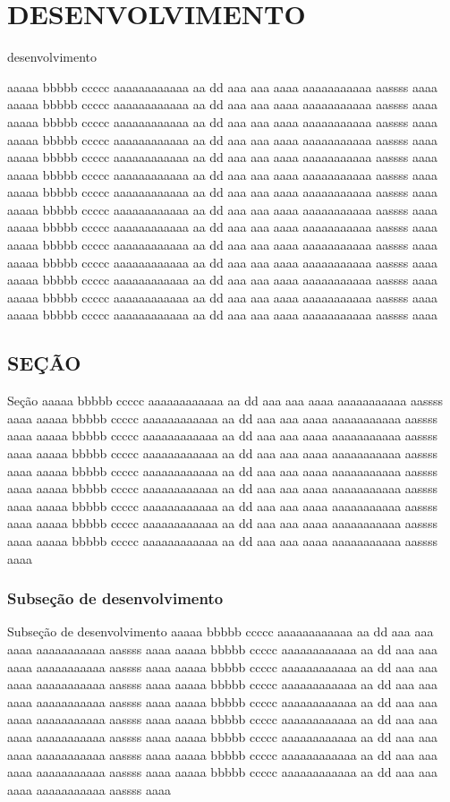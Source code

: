 \chapter{DESENVOLVIMENTO}{desenvolvimento}

aaaaa bbbbb ccccc aaaaaaaaaaaa aa dd  aaa aaa aaaa aaaaaaaaaaa aassss aaaa 
aaaaa bbbbb ccccc aaaaaaaaaaaa aa dd  aaa aaa aaaa aaaaaaaaaaa aassss aaaa
aaaaa bbbbb ccccc aaaaaaaaaaaa aa dd  aaa aaa aaaa aaaaaaaaaaa aassss aaaa
aaaaa bbbbb ccccc aaaaaaaaaaaa aa dd  aaa aaa aaaa aaaaaaaaaaa aassss aaaa
aaaaa bbbbb ccccc aaaaaaaaaaaa aa dd  aaa aaa aaaa aaaaaaaaaaa aassss aaaa
aaaaa bbbbb ccccc aaaaaaaaaaaa aa dd  aaa aaa aaaa aaaaaaaaaaa aassss aaaa
aaaaa bbbbb ccccc aaaaaaaaaaaa aa dd  aaa aaa aaaa aaaaaaaaaaa aassss aaaa
aaaaa bbbbb ccccc aaaaaaaaaaaa aa dd  aaa aaa aaaa aaaaaaaaaaa aassss aaaa
aaaaa bbbbb ccccc aaaaaaaaaaaa aa dd  aaa aaa aaaa aaaaaaaaaaa aassss aaaa
aaaaa bbbbb ccccc aaaaaaaaaaaa aa dd  aaa aaa aaaa aaaaaaaaaaa aassss aaaa
aaaaa bbbbb ccccc aaaaaaaaaaaa aa dd  aaa aaa aaaa aaaaaaaaaaa aassss aaaa
aaaaa bbbbb ccccc aaaaaaaaaaaa aa dd  aaa aaa aaaa aaaaaaaaaaa aassss aaaa
aaaaa bbbbb ccccc aaaaaaaaaaaa aa dd  aaa aaa aaaa aaaaaaaaaaa aassss aaaa
aaaaa bbbbb ccccc aaaaaaaaaaaa aa dd  aaa aaa aaaa aaaaaaaaaaa aassss aaaa

\section{SEÇÃO}{Seção}
aaaaa bbbbb ccccc aaaaaaaaaaaa aa dd  aaa aaa aaaa aaaaaaaaaaa aassss aaaa
aaaaa bbbbb ccccc aaaaaaaaaaaa aa dd  aaa aaa aaaa aaaaaaaaaaa aassss aaaa
aaaaa bbbbb ccccc aaaaaaaaaaaa aa dd  aaa aaa aaaa aaaaaaaaaaa aassss aaaa
aaaaa bbbbb ccccc aaaaaaaaaaaa aa dd  aaa aaa aaaa aaaaaaaaaaa aassss aaaa
aaaaa bbbbb ccccc aaaaaaaaaaaa aa dd  aaa aaa aaaa aaaaaaaaaaa aassss aaaa
aaaaa bbbbb ccccc aaaaaaaaaaaa aa dd  aaa aaa aaaa aaaaaaaaaaa aassss aaaa
aaaaa bbbbb ccccc aaaaaaaaaaaa aa dd  aaa aaa aaaa aaaaaaaaaaa aassss aaaa
aaaaa bbbbb ccccc aaaaaaaaaaaa aa dd  aaa aaa aaaa aaaaaaaaaaa aassss aaaa
aaaaa bbbbb ccccc aaaaaaaaaaaa aa dd  aaa aaa aaaa aaaaaaaaaaa aassss aaaa
\subsection{\textbf{Subseção de desenvolvimento}}{Subseção de desenvolvimento}
aaaaa bbbbb ccccc aaaaaaaaaaaa aa dd  aaa aaa aaaa aaaaaaaaaaa aassss aaaa
aaaaa bbbbb ccccc aaaaaaaaaaaa aa dd  aaa aaa aaaa aaaaaaaaaaa aassss aaaa
aaaaa bbbbb ccccc aaaaaaaaaaaa aa dd  aaa aaa aaaa aaaaaaaaaaa aassss aaaa
aaaaa bbbbb ccccc aaaaaaaaaaaa aa dd  aaa aaa aaaa aaaaaaaaaaa aassss aaaa
aaaaa bbbbb ccccc aaaaaaaaaaaa aa dd  aaa aaa aaaa aaaaaaaaaaa aassss aaaa
aaaaa bbbbb ccccc aaaaaaaaaaaa aa dd  aaa aaa aaaa aaaaaaaaaaa aassss aaaa
aaaaa bbbbb ccccc aaaaaaaaaaaa aa dd  aaa aaa aaaa aaaaaaaaaaa aassss aaaa
aaaaa bbbbb ccccc aaaaaaaaaaaa aa dd  aaa aaa aaaa aaaaaaaaaaa aassss aaaa
aaaaa bbbbb ccccc aaaaaaaaaaaa aa dd  aaa aaa aaaa aaaaaaaaaaa aassss aaaa
